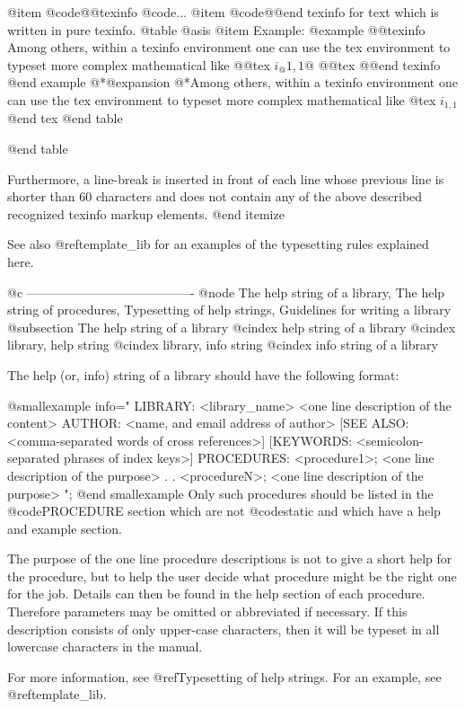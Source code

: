 {{{{@item @code{@@texinfo}
 @code{...}
@item @code{@@end texinfo}
for text which is written in pure texinfo.
@table @asis
@item Example:
@example
@@texinfo
Among others, within a texinfo environment
one can use the tex environment to typeset
more complex mathematical like
@@tex
$i_@{1,1@} $
@@tex
@@end texinfo
@end example
@*@expansion{}
@*Among others, within a texinfo environment one can use the tex environment
to typeset more complex mathematical like
@tex
$ i_{1,1} $
@end tex
@end table

@end table

Furthermore, a line-break is inserted in front of each line
whose previous line is shorter than 60
characters and does not contain any of the above described recognized
texinfo markup elements.
@end itemize

See also @ref{template_lib} for an examples of the typesetting rules
explained here.

@c ----------------------------------------
@node The help string of a library, The help string of procedures, Typesetting of help strings, Guidelines for writing a library
@subsection The help string of a library
@cindex help string of a library
@cindex library, help string
@cindex library, info string
@cindex info string of a library

The help (or, info) string of a library should have the following format:

@smallexample
info="
LIBRARY: <library_name> <one line description of the content>
AUTHOR:  <name, and email address of author>
[SEE ALSO: <comma-separated words of cross references>]
[KEYWORDS: <semicolon-separated phrases of index keys>]
PROCEDURES:
  <procedure1>;     <one line description of the purpose>
   .
   .
  <procedureN>;     <one line description of the purpose>
";
@end smallexample
Only such procedures should be listed in the @code{PROCEDURE} section
which are not @code{static} and which
have a help and example section.

The purpose of the one line procedure descriptions is not to give a short help
for the procedure, but to help the user decide what procedure might be
the right one for the job. Details can then be found in the help section
of each procedure. Therefore parameters may be omitted or abbreviated if
necessary. If this description consists of only upper-case characters,
then it will be typeset in all lowercase characters in the manual.

For more information, see @ref{Typesetting of help strings}. For an
example, see @ref{template_lib}.


}}}}
